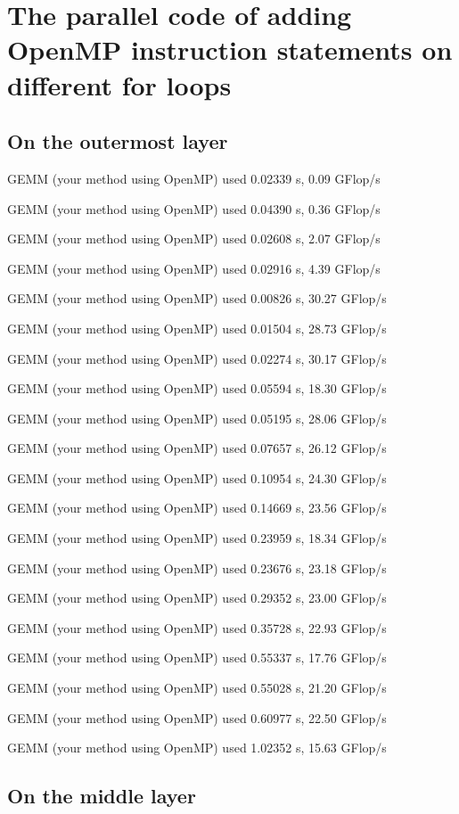 \documentclass[12pt]{article}
\begin{document}
\section{The parallel code of adding OpenMP instruction statements on different for loops}
\subsection{On the outermost layer}

GEMM (your method using OpenMP) used 0.02339 s, 0.09 GFlop/s

GEMM (your method using OpenMP) used 0.04390 s, 0.36 GFlop/s

GEMM (your method using OpenMP) used 0.02608 s, 2.07 GFlop/s

GEMM (your method using OpenMP) used 0.02916 s, 4.39 GFlop/s

GEMM (your method using OpenMP) used 0.00826 s, 30.27 GFlop/s

GEMM (your method using OpenMP) used 0.01504 s, 28.73 GFlop/s

GEMM (your method using OpenMP) used 0.02274 s, 30.17 GFlop/s

GEMM (your method using OpenMP) used 0.05594 s, 18.30 GFlop/s

GEMM (your method using OpenMP) used 0.05195 s, 28.06 GFlop/s

GEMM (your method using OpenMP) used 0.07657 s, 26.12 GFlop/s

GEMM (your method using OpenMP) used 0.10954 s, 24.30 GFlop/s

GEMM (your method using OpenMP) used 0.14669 s, 23.56 GFlop/s

GEMM (your method using OpenMP) used 0.23959 s, 18.34 GFlop/s

GEMM (your method using OpenMP) used 0.23676 s, 23.18 GFlop/s

GEMM (your method using OpenMP) used 0.29352 s, 23.00 GFlop/s

GEMM (your method using OpenMP) used 0.35728 s, 22.93 GFlop/s

GEMM (your method using OpenMP) used 0.55337 s, 17.76 GFlop/s

GEMM (your method using OpenMP) used 0.55028 s, 21.20 GFlop/s

GEMM (your method using OpenMP) used 0.60977 s, 22.50 GFlop/s

GEMM (your method using OpenMP) used 1.02352 s, 15.63 GFlop/s

\subsection{On the middle layer}
\end{document}
